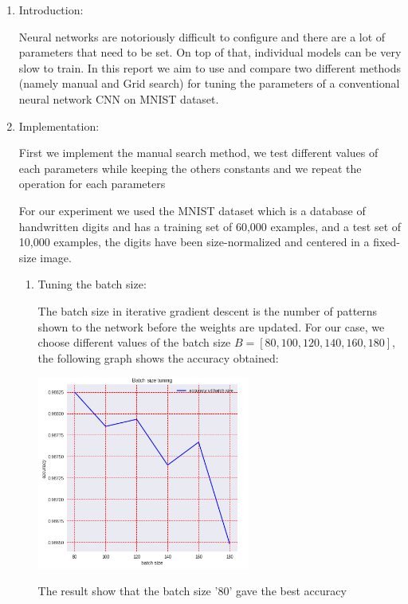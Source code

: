 \documentclass[12pt,a4paper]{report}
\begin{document}
\begin{enumerate}
\item Introduction:

Neural networks are notoriously difficult to configure and there are a lot of parameters that need to be set. On top of that, individual models can be very slow to train.
In this report we aim to use and compare two different methods (namely manual and Grid search) for tuning the parameters of a conventional neural network CNN on MNIST dataset.   

\item Implementation:

First we implement the manual search method, we test different values of each parameters while keeping the others constants and we repeat the operation for each parameters  	 

For our experiment we used the MNIST dataset which is a database of handwritten digits and has a training set of 60,000 examples, and a test set of 10,000 examples, the digits have been size-normalized and centered in a fixed-size image.

\begin{enumerate}
\item Tuning the batch size:

The batch size in iterative gradient descent is the number of patterns shown to the network before the weights are updated.
For our case,  we choose  different values of the batch size $B=[80, 100, 120, 140, 160,180]$, 
the following graph shows the accuracy obtained:

\begin{center}
\includegraphics[width=7cm]{Capture1.png}
\end{center}

The result show that the batch size '80' gave the best accuracy 


\end{enumerate}
\end{enumerate}
\end{document}
